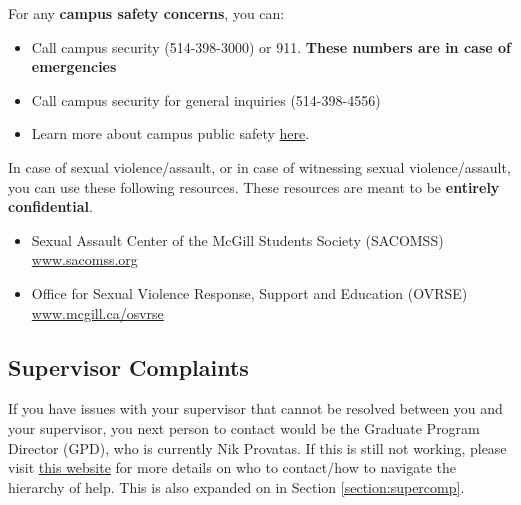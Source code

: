 For any \textbf{campus safety concerns}, you can:
\begin{itemize}
    \item Call campus security (514-398-3000) or 911. \textbf{These numbers are in case of emergencies}
    \item Call campus security for general inquiries (514-398-4556)
    \item Learn more about campus public safety \href{https://www.mcgill.ca/campussafety/}{here}.
\end{itemize} 

In case of sexual violence/assault, or in case of witnessing sexual violence/assault, you can use these following resources. These resources are meant to be \textbf{entirely confidential}.
\begin{itemize}
    \item Sexual Assault Center of the McGill Students Society (SACOMSS) \href{www.sacomss.org}{www.sacomss.org}
    \item Office for Sexual Violence Response, Support and Education (OVRSE) \href{https://www.mcgill.ca/osvrse/}{www.mcgill.ca/osvrse}
\end{itemize}

\subsection{Supervisor Complaints}

If you have issues with your supervisor that cannot be resolved between you and your supervisor, you next person to contact would be the Graduate Program Director (GPD), who is currently Nik Provatas.
If this is still not working, please visit \href{https://www.mcgill.ca/expmed/policies/conflict-resolution-policy}{this website} for more details on who to contact/how to navigate the hierarchy of help. This is also expanded on in Section \hyperref[section:supercomp]{\textcolor{purble}{\ref*{section:supercomp}}}.

